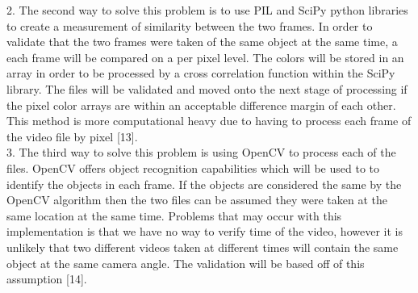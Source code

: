 \documentclass[10pt,draftclsnofoot,onecolumn]{IEEEtran}
\newcommand\tab[1][1cm]{\hspace*{#1}}
\begin{document}
\tab \tab \tab 2. The second way to solve this problem is to use PIL and SciPy python libraries to create \tab \tab \tab a measurement of similarity between the two frames. In order to validate that the two frames \tab \tab \tab were taken of the same object at the same time, a each frame will be compared on a per \tab \tab \tab pixel level. The colors will be stored in an array in order to be processed by a cross \newline \tab \tab \tab correlation function within the SciPy library. The files will be validated and moved onto the \tab \tab \tab next stage of processing if the pixel color arrays are within an acceptable difference \newline \tab \tab \tab margin of each other. This method is more computational heavy due to having to process \tab \tab \tab each frame of the video file by pixel [13].
 \\
\tab \tab \tab 3.  The third way to solve this problem is using OpenCV to process each of the files. OpenCV \tab \tab \tab offers object recognition capabilities which will be used to to identify the objects in each frame. \tab \tab \tab If the objects are considered the same by the OpenCV algorithm then the two files can be \tab \tab \tab assumed they were taken at the same location at the same time. Problems that may occur \tab \tab \tab with this implementation is that we have no way to verify time of the video, however it is \tab \tab \tab unlikely that two different videos taken at different times will contain the same object at the \tab \tab \tab same camera angle. The validation will be based off of this assumption [14]. 
\end{document}
